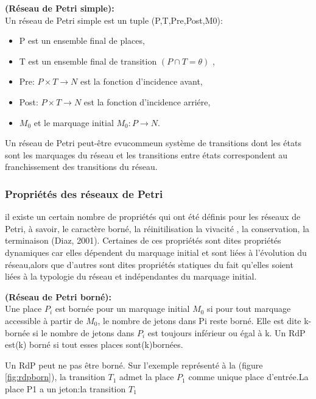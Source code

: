 \begin{defn}\textbf{\textbf{(Réseau de Petri simple):}}
	\\
Un réseau de Petri simple est un tuple
 (P,T,Pre,Post,M0):
 
 \begin{itemize}
\item  	P est un ensemble final de places,
\item T est un ensemble final de transition $ (P \cap T = \theta ) $ ,
\item Pre: $P \times T \to N$ est la fonction d'incidence avant,
\item Post: $P \times T \to N$ est la fonction d'incidence arriére,
\item $M_{0}$ et le marquage initial $M_{0}:  P \to N$.
  \end{itemize}

\end{defn}




Un réseau de Petri peut-être evucommeun système de transitions dont les états sont les marquages du réseau et les transitions entre états correspondent au franchissement des transitions du réseau.
\subsubsection{Propriétés des réseaux de Petri}
il existe un certain nombre de propriétés qui ont été définis pour les réseaux de Petri, à savoir, le caractère borné, la réinitilisation la vivacité , la conservation, la terminaison (Diaz, 2001). Certaines de ces propriétés sont dites propriétés dynamiques car elles dépendent du marquage initial et sont liées à l'évolution du réseau,alors que d'autres sont dites propriétés statiques du fait qu'elles soient liées à la typologie du réseau et indépendantes du marquage initial.


\begin{defn}\textbf{\textbf{(Réseau de Petri borné):}}\\
Une place $ P_{i} $ est bornée pour un marquage initial $ M_{0} $ si pour tout marquage accessible à partir de $ M_{0} $, le nombre de jetons dans Pi reste borné. Elle est dite k-bornée si le nombre de jetons dans $ P_{i} $ est toujours inférieur ou égal à k. Un RdP est(k) borné si tout esses places sont(k)bornées.

\end{defn}

\begin{exmp}
 Un RdP peut ne pas être borné. Sur l'exemple représenté à la (figure \ref{fig:rdpborn}), la transition $ T_{1} $ admet la place $ P_{1} $ comme unique place d'entrée.La place P1 a un jeton:la transition $ T_{1} $
\end{exmp}

